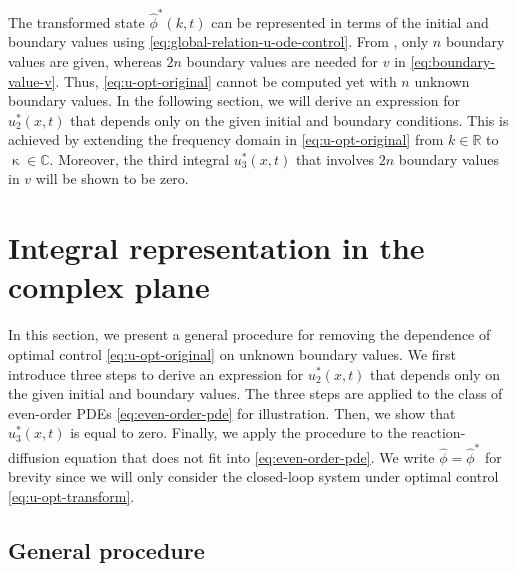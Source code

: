 \documentclass[journal,twoside,web]{ieeecolor}
\newcommand{\RR}{\mathbb{R}}
\newcommand{\CC}{\mathbb{C}}
\newcommand{\state}{\phi}
\newcommand{\statehat}{\hat{\state}}
\newcommand{\im}{\mathbf{i}}
\newcommand{\kcomplex}{\upkappa}
\begin{document}
The transformed state $\statehat^*(k,t)$ can be represented in terms of the initial and boundary values using \eqref{eq:global-relation-u-ode-control}.
From , only $n$ boundary values are given, whereas $2n$ boundary values are needed for $v$ in \eqref{eq:boundary-value-v}. Thus, \eqref{eq:u-opt-original} cannot be computed yet with $n$ unknown boundary values.
In the following section, we will derive an expression for $u^*_2(x,t)$ that depends only on the given initial and boundary conditions.
This is achieved by extending the frequency domain in \eqref{eq:u-opt-original} from $k\in\RR$ to $\kcomplex\in\CC$.
Moreover, the third integral $u^*_3(x,t)$ that involves $2n$ boundary values in $v$ will be shown to be zero. 

\section{Integral representation in the complex plane}\label{sec:integral-representation-complex}
In this section, we present a general procedure for removing the dependence of optimal control \eqref{eq:u-opt-original} on unknown boundary values.
We first introduce three steps to derive an expression for $u^*_2(x,t)$ that depends only on the given initial and boundary values.
The three steps are applied to the class of even-order PDEs \eqref{eq:even-order-pde} for illustration.
Then, we show that $u^*_3(x,t)$ is equal to zero. 
Finally, we apply the procedure to the reaction-diffusion equation that does not fit into \eqref{eq:even-order-pde}.
We write $\statehat=\statehat^*$ for brevity since we will only consider the closed-loop system under optimal control \eqref{eq:u-opt-transform}.

\subsection{General procedure}

\label{sec:general-procedures}
\end{document}
